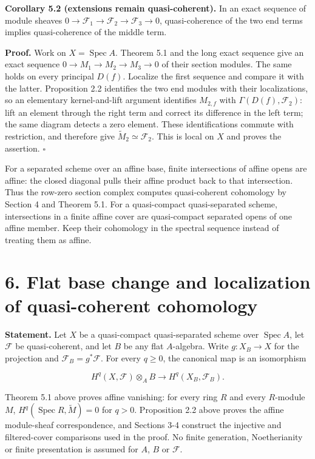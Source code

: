\documentclass[11pt,a4paper,openany]{report}
\begin{document}
\textbf{Corollary 5.2 (extensions remain quasi-coherent).} In an exact sequence of module sheaves \(0\to\mathcal F_1\to\mathcal F_2\to\mathcal F_3\to0\), quasi-coherence of the two end terms implies quasi-coherence of the middle term.

\textbf{Proof.} Work on \(X=\operatorname{Spec}A\). Theorem 5.1 and the long exact sequence give an exact sequence \(0\to M_1\to M_2\to M_3\to0\) of their section modules. The same holds on every principal \(D(f)\). Localize the first sequence and compare it with the latter. Proposition 2.2 identifies the two end modules with their localizations, so an elementary kernel-and-lift argument identifies \(M_{2,f}\) with \(\Gamma(D(f),\mathcal F_2)\): lift an element through the right term and correct its difference in the left term; the same diagram detects a zero element. These identifications commute with restriction, and therefore give \(\widetilde M_2\simeq\mathcal F_2\). This is local on \(X\) and proves the assertion. \(\square\)

For a separated scheme over an affine base, finite intersections of affine opens are affine: the closed diagonal pulls their affine product back to that intersection. Thus the row-zero section complex computes quasi-coherent cohomology by Section 4 and Theorem 5.1. For a quasi-compact quasi-separated scheme, intersections in a finite affine cover are quasi-compact separated opens of one affine member. Keep their cohomology in the spectral sequence instead of treating them as affine.

\section{6. Flat base change and localization of quasi-coherent cohomology}\label{AG-RG-S01-flat-base-change-and-localization-of-quasi-coherent-cohomology}

\textbf{Statement.} Let \(X\) be a quasi-compact quasi-separated scheme over \(\operatorname{Spec}A\), let \(\mathcal F\) be quasi-coherent, and let \(B\) be any flat \(A\)-algebra. Write \(g:X_B\to X\) for the projection and \(\mathcal F_B=g^*\mathcal F\). For every \(q\geq0\), the canonical map is an isomorphism

\[
H^q(X,\mathcal F)\otimes_A B
\longrightarrow H^q(X_B,\mathcal F_B).
\]

Theorem 5.1 above proves affine vanishing: for every ring \(R\) and every \(R\)-module \(M\), \(H^q(\operatorname{Spec}R,\widetilde M)=0\) for \(q>0\). Proposition 2.2 above proves the affine module-sheaf correspondence, and Sections 3-4 construct the injective and filtered-cover comparisons used in the proof. No finite generation, Noetherianity or finite presentation is assumed for \(A\), \(B\) or \(\mathcal F\).
\end{document}
